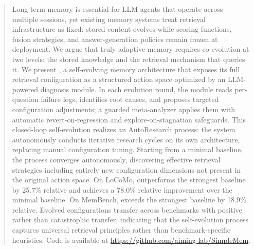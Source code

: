 
\begin{abstract}
Long-term memory is essential for LLM agents that operate across multiple sessions, yet existing memory systems treat retrieval infrastructure as fixed: stored content evolves while scoring functions, fusion strategies, and answer-generation policies remain frozen at deployment. We argue that truly adaptive memory requires co-evolution at two levels: the stored knowledge and the retrieval mechanism that queries it. We present \ours{}, a self-evolving memory architecture that exposes its full retrieval configuration as a structured action space optimized by an LLM-powered diagnosis module. In each evolution round, the module reads per-question failure logs, identifies root causes, and proposes targeted configuration adjustments; a guarded meta-analyzer applies them with automatic revert-on-regression and explore-on-stagnation safeguards. This closed-loop self-evolution realizes an AutoResearch process: the system autonomously conducts iterative research cycles on its own architecture, replacing manual configuration tuning. Starting from a minimal baseline, the process converges autonomously, discovering effective retrieval strategies including entirely new configuration dimensions not present in the original action space. On LoCoMo, \ours{} outperforms the strongest baseline by 25.7\% relative and achieves a 78.0\% relative improvement over the minimal baseline. On MemBench, \ours{} exceeds the strongest baseline by 18.9\% relative. Evolved configurations transfer across benchmarks with positive rather than catastrophic transfer, indicating that the self-evolution process captures universal retrieval principles rather than benchmark-specific heuristics. Code is available at \url{https://github.com/aiming-lab/SimpleMem}.
\end{abstract}

